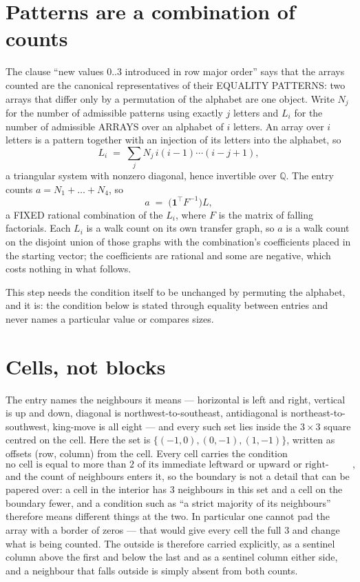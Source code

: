 \documentclass[11pt,a4paper]{article}
\theoremstyle{plain}
\theoremstyle{definition}
\begin{document}
\section{Patterns are a combination of counts}

The clause ``new values $0..3$ introduced in row major order'' says that the arrays
counted are the canonical representatives of their EQUALITY PATTERNS: two arrays that differ
only by a permutation of the alphabet are one object. Write $N_j$ for the number of admissible
patterns using exactly $j$ letters and $L_i$ for the number of admissible ARRAYS over an
alphabet of $i$ letters. An array over $i$ letters is a pattern together with an injection of
its letters into the alphabet, so
\[
L_i\;=\;\sum_{j}N_j\,i(i-1)\cdots(i-j+1),
\]
a triangular system with nonzero diagonal, hence invertible over $\mathbb{Q}$. The entry
counts $a=N_1+\dots+N_{4}$, so
\[
a\;=\;\bigl(\mathbf{1}^{\!\top}F^{-1}\bigr)L ,
\]
a FIXED rational combination of the $L_i$, where $F$ is the matrix of falling factorials.
Each $L_i$ is a walk count on its own transfer graph, so $a$ is a walk count on the disjoint
union of those graphs with the combination's coefficients placed in the starting vector; the
coefficients are rational and some are negative, which costs nothing in what follows.

This step needs the condition itself to be unchanged by permuting the alphabet, and it is:
the condition below is stated through equality between entries and never names a particular
value or compares sizes.

\section{Cells, not blocks}

The entry names the neighbours it means --- horizontal is left and right, vertical is up and
down, diagonal is northwest-to-southeast, antidiagonal is northeast-to-southwest, king-move is
all eight --- and every such set lies inside the $3\times3$ square centred on the cell. Here
the set is $\{(-1,0), (0,-1), (1,-1)\}$, written as offsets (row, column) from the cell. Every cell carries
the condition
\[
\text{no cell is equal to more than 2 of its immediate leftward or upward or right-upward antidiagonal neighbours},
\]
and the count of neighbours enters it, so the boundary is not a detail that can be papered
over: a cell in the interior has $3$ neighbours in this set and a cell on the boundary
fewer, and a condition such as ``a strict majority of its neighbours'' therefore means
different things at the two. In particular one cannot pad the array with a border of zeros ---
that would give every cell the full $3$ and change what is being counted. The outside is
therefore carried
explicitly, as a sentinel column above the first and below the last and as a sentinel column
either side, and a neighbour that falls outside is simply absent from both counts.
\end{document}
